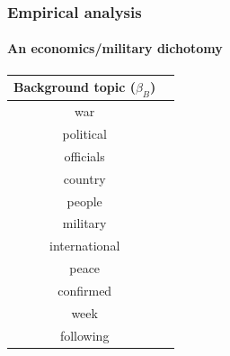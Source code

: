 \subsubsection*{Empirical analysis}
\paragraph{An economics/military dichotomy}



\begin{table}
  \center
\begin{tabular}{|c|c|}
  \hline
  \textbf{Background topic ($\beta_{B}$)} \\
  \hline
  war \\
  political \\
  officials \\
  country \\
  people \\
  military \\
  international \\
  peace \\
  confirmed \\
  week \\
  following \\

\end{tabular}
\end{table}

